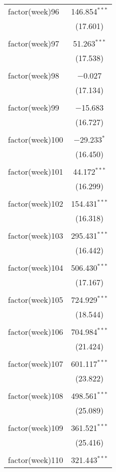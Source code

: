 \documentclass[twoside,twocolumn]{article}
\begin{document}
\begin{table}[!htbp]
\begin{tabular}{@{\extracolsep{5pt}}lc}
 factor(week)96 & 146.854$^{***}$ \\ 
  & (17.601) \\ 
  & \\ 
 factor(week)97 & 51.263$^{***}$ \\ 
  & (17.538) \\ 
  & \\ 
 factor(week)98 & $-$0.027 \\ 
  & (17.134) \\ 
  & \\ 
 factor(week)99 & $-$15.683 \\ 
  & (16.727) \\ 
  & \\ 
 factor(week)100 & $-$29.233$^{*}$ \\ 
  & (16.450) \\ 
  & \\ 
 factor(week)101 & 44.172$^{***}$ \\ 
  & (16.299) \\ 
  & \\ 
 factor(week)102 & 154.431$^{***}$ \\ 
  & (16.318) \\ 
  & \\ 
 factor(week)103 & 295.431$^{***}$ \\ 
  & (16.442) \\ 
  & \\ 
 factor(week)104 & 506.430$^{***}$ \\ 
  & (17.167) \\ 
  & \\ 
 factor(week)105 & 724.929$^{***}$ \\ 
  & (18.544) \\ 
  & \\ 
 factor(week)106 & 704.984$^{***}$ \\ 
  & (21.424) \\ 
  & \\ 
 factor(week)107 & 601.117$^{***}$ \\ 
  & (23.822) \\ 
  & \\ 
 factor(week)108 & 498.561$^{***}$ \\ 
  & (25.089) \\ 
  & \\ 
 factor(week)109 & 361.521$^{***}$ \\ 
  & (25.416) \\ 
  & \\ 
 factor(week)110 & 321.443$^{***}$ \\ 

\end{tabular}
\end{table}
\end{document}
